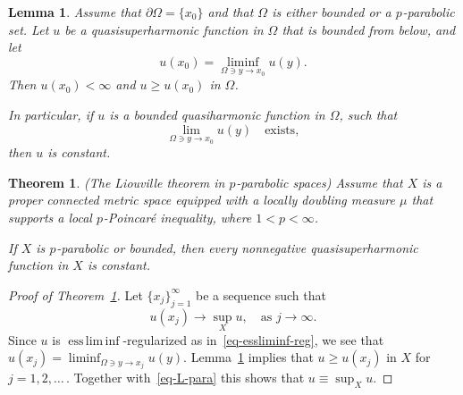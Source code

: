 \documentclass[10pt,a4paper]{amsart}
\newtheorem{thm}{Theorem}
\newtheorem{lem}{Lemma}
\newcommand{\Om}{\Omega}
\newcommand{\bdry}{\partial}
\newcommand{\bdy}{\bdry}
\DeclareMathOperator*{\essliminf}{ess\,lim\,inf}
\newcommand{\p}{{$p\mspace{1mu}$}}
\begin{document}
\begin{lem}   \label{lem-quasi-Liouville-Om}
Assume that $\bdy\Om = \{x_0\}$ and that $\Om$ is either
bounded or a \p-parabolic set.
Let $u$ be a 
quasisuperharmonic function in $\Om$ that is bounded from below,
and let
\begin{equation}   \label{eq-def-u-x0}
u(x_0)=\liminf_{\Om\ni y\to x_0} u(y).
\end{equation}
Then $u(x_0)<\infty$ and $u\ge u(x_0)$ in $\Om$.

In particular, if $u$ is a bounded quasiharmonic function in $\Om$, such that 
\begin{equation}   \label{eq-lim-u-x0}
\lim_{\Om\ni y\to x_0} u(y)\quad \text{exists},
\end{equation}
then $u$ is constant.
\end{lem}

\begin{thm} \label{thm-Liouville-para}
\textup{(The Liouville theorem in \p-parabolic spaces)}
Assume that   $X$ is a proper connected metric space
equipped with a locally doubling measure $\mu$ that
supports a local \p-Poincar\'e inequality, where $1<p<\infty$.

If $X$ is \p-parabolic or bounded, then 
every nonnegative quasisuperharmonic function in $X$
is constant.
\end{thm}

\begin{proof}[Proof of Theorem~\ref{thm-Liouville-para}]
Let $\{x_j\}_{j=1}^\infty$ be a sequence such that 
\begin{equation} \label{eq-L-para} 
u(x_j)\to \sup_X u,
\quad \text{as } j\to\infty.
\end{equation}
Since $u$ is $\essliminf$-regularized
as in~\eqref{eq-essliminf-reg}, we see that
$u(x_j)=\liminf_{\Om\ni y\to x_j} u(y)$.
Lemma~\ref{lem-quasi-Liouville-Om} implies that
$u  \ge u(x_j)$ in $X$ for $j=1,2,\dots$\,.
Together with~\eqref{eq-L-para} this shows that $u \equiv \sup_X u$.
\end{proof}
\end{document}
